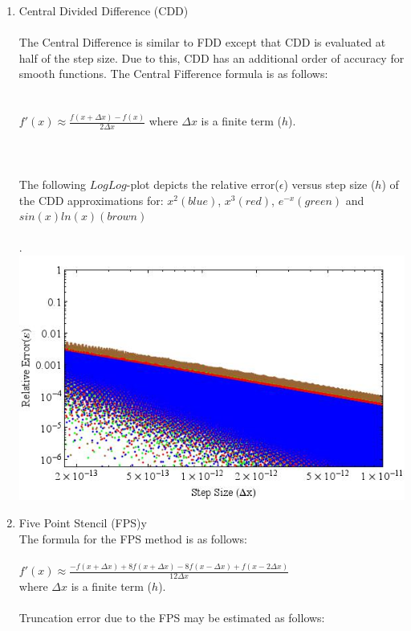 \documentclass{report}
\begin{document}
\begin{enumerate}
\\
\\
\\
\item Central Divided Difference (CDD)
\\
\\The Central Difference is similar to FDD except that CDD is evaluated at half of the step size. Due to this, CDD has an additional order of accuracy for smooth functions. The Central Fifference formula is as follows:
\\
\\
\\$\displaystyle f'(x) \approx \frac{f(x+\Delta x)-f(x)}{2\Delta x}$ where $\Delta x$ is a finite term ($h$).
\\
\\
\\\\The following $LogLog$-plot depicts the relative error($\epsilon$) versus step size ($h$) of the CDD approximations for: $x^2(blue)$, $x^3(red)$, $e^{-x}(green)$ and $sin(x)ln(x)(brown)$
\\
\\.\hspace{6 mm} \includegraphics[scale=.5]{centralDiff.jpeg}
\item Five Point Stencil (FPS)y
\\The formula for the FPS method is as follows:
\\
\\$\displaystyle f'(x) \approx \frac{-f(x+\Delta x)+8f(x+\Delta x)-8f(x-\Delta x)+f(x-2\Delta x)}{12\Delta x}$ 
\\where $\Delta x$ is a finite term ($h$).
\\
\\Truncation error due to the FPS may be estimated as follows:

\end{enumerate}
\end{document}

